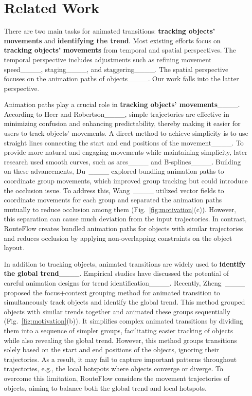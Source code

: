 \section{Related Work}
There are two main tasks for animated transitions: \textbf{tracking objects' movements} and \textbf{identifying the trend}.
Most existing efforts focus on \textbf{tracking objects' movements} from temporal and spatial perspectives.
The temporal perspective includes adjustments such as refining movement speed____, staging____, and staggering____.
The spatial perspective focuses on the animation paths of objects____.
Our work falls into the latter perspective.

Animation paths play a crucial role in \textbf{tracking objects' movements}____.
According to Heer and Robertson____, simple trajectories are effective in minimizing confusion and enhancing predictability, thereby making it easier for users to track objects' movements.
A direct method to achieve simplicity is to use straight lines connecting the start and end positions of the movement____.
To provide more natural and engaging movements while maintaining simplicity, later research used smooth curves, such as arcs____ and B-splines____. 
Building on these advancements, Du~\etal____ explored bundling animation paths to coordinate group movements, which improved group tracking
but could introduce the occlusion issue.
To address this, Wang~\etal____ utilized vector fields to coordinate movements for each group and separated the animation paths mutually to reduce occlusion among them (Fig.~\ref{fig:motivation}(c)).
However, this separation can cause much deviation from the input trajectories.
In contrast, RouteFlow creates bundled animation paths for objects with similar trajectories and reduces occlusion by applying non-overlapping constraints on the object layout.



In addition to tracking objects, animated transitions are widely used to \textbf{identify the global trend}____.
Empirical studies have discussed the potential of careful animation designs for trend identification____. 
Recently, Zheng~\etal____ proposed the focus+context grouping method for animated transition to simultaneously track objects and identify the global trend. 
This method grouped objects with similar trends together and animated these groups sequentially (Fig.~\ref{fig:motivation}(b)).
It simplifies complex animated transitions by dividing them into a sequence of simpler groups, facilitating easier tracking of objects while also revealing the global trend.
However, this method groups transitions solely based on the start and end positions of the objects, ignoring their trajectories.
As a result, it may fail to capture important patterns throughout trajectories, e.g., the local hotspots where objects converge or diverge.
To overcome this limitation, RouteFlow considers the movement trajectories of objects, aiming to balance both the global trend and local hotspots. 

